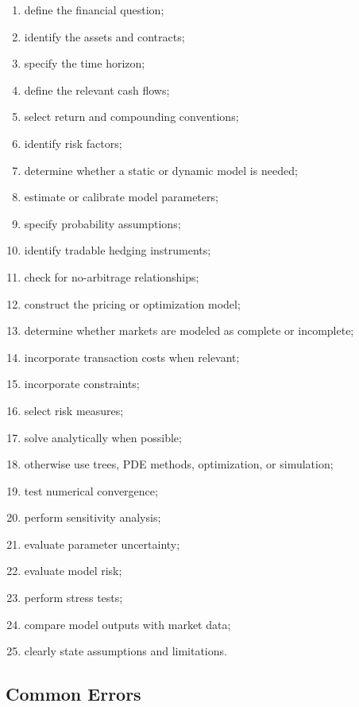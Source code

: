 \begin{enumerate}
    \item define the financial question;
    \item identify the assets and contracts;
    \item specify the time horizon;
    \item define the relevant cash flows;
    \item select return and compounding conventions;
    \item identify risk factors;
    \item determine whether a static or dynamic model is needed;
    \item estimate or calibrate model parameters;
    \item specify probability assumptions;
    \item identify tradable hedging instruments;
    \item check for no-arbitrage relationships;
    \item construct the pricing or optimization model;
    \item determine whether markets are modeled as complete or incomplete;
    \item incorporate transaction costs when relevant;
    \item incorporate constraints;
    \item select risk measures;
    \item solve analytically when possible;
    \item otherwise use trees, PDE methods, optimization, or simulation;
    \item test numerical convergence;
    \item perform sensitivity analysis;
    \item evaluate parameter uncertainty;
    \item evaluate model risk;
    \item perform stress tests;
    \item compare model outputs with market data;
    \item clearly state assumptions and limitations.
\end{enumerate}

\subsection{Common Errors}
\label{subsec:mathematical-finance-common-errors}

